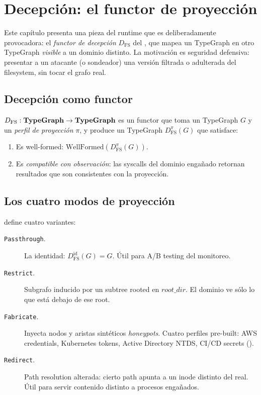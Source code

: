 \chapter{Decepción: el functor de proyección}
\label{cap:decepcion}

Este capítulo presenta una pieza del runtime que es deliberadamente
provocadora: el \emph{functor de decepción} $D_{\mathrm{FS}}$ del
, que mapea un TypeGraph en otro TypeGraph
\emph{visible} a un dominio distinto. La motivación es seguridad
defensiva: presentar a un atacante (o sondeador) una versión filtrada
o adulterada del filesystem, sin tocar el grafo real.

\section{Decepción como functor}

\begin{defn}
\label{def:dfs}
$D_{\mathrm{FS}}: \mathbf{TypeGraph} \to \mathbf{TypeGraph}$ es un functor que toma un
TypeGraph $G$ y un \emph{perfil de proyección} $\pi$, y produce un
TypeGraph $D_{\mathrm{FS}}^{\pi}(G)$ que satisface:
\begin{enumerate}
  \item Es well-formed: $\mathrm{WellFormed}(D_{\mathrm{FS}}^{\pi}(G))$.
  \item Es \emph{compatible con observación}: las syscalls del
    dominio engañado retornan resultados que son consistentes con la
    proyección.
\end{enumerate}
\end{defn}

\section{Los cuatro modos de proyección}

 define cuatro variantes:

\begin{description}
  \item[\texttt{Passthrough}.] La identidad: $D_{\mathrm{FS}}^{\mathrm{id}}(G)
    = G$. Útil para A/B testing del monitoreo.
  \item[\texttt{Restrict}.] Subgrafo inducido por un subtree rooted en
    $\mathit{root\_dir}$. El dominio ve sólo lo que está debajo de
    ese root.
  \item[\texttt{Fabricate}.] Inyecta nodos y aristas sintéticos
    \emph{honeypots}. Cuatro perfiles pre-built: AWS credentials,
    Kubernetes tokens, Active Directory NTDS, CI/CD secrets
    ().
  \item[\texttt{Redirect}.] Path resolution alterada: cierto path
    apunta a un inode distinto del real. Útil para servir contenido
    distinto a procesos engañados.
\end{description}

